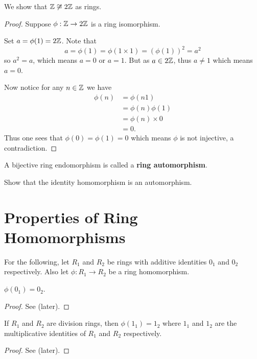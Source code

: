 \begin{example}
    We show that $\mathbb{Z} \not\cong 2\mathbb{Z}$ as rings.

    \begin{proof}
        Suppose $\phi: \mathbb{Z} \to 2\mathbb{Z}$ is a ring isomorphism.

        Set $a = \phi(1) = 2\mathbb{Z}$. Note that
        \[
            a = \phi(1) = \phi(1\times1) = (\phi(1))^2 = a^2
        \]
        so $a^2 = a$, which means $a = 0$ or $a = 1$. But as $a \in 2\mathbb{Z}$, thus $a \neq 1$ which means $a = 0$.

        Now notice for any $n \in \mathbb{Z}$ we have
        \begin{align*}
            \phi(n) &= \phi(n1)\\
            &= \phi(n)\phi(1)\\
            &= \phi(n) \times 0\\
            &= 0.
        \end{align*}
        Thus one sees that $\phi(0) = \phi(1) = 0$ which means $\phi$ is not injective, a contradiction.
    \end{proof}
\end{example}

\begin{definition}
    A bijective ring endomorphism is called a \textbf{ring automorphism}.
\end{definition}

\begin{exercise}\label{exercise-identity-homomorphism-is-an-isomorphism}
    Show that the identity homomorphism is an automorphism.
\end{exercise}

\section{Properties of Ring Homomorphisms}
For the following, let $R_1$ and $R_2$ be rings with additive identities $0_1$ and $0_2$ respectively. Also let $\phi: R_1 \to R_2$ be a ring homomorphism.

\begin{proposition}\label{prop-ring-image-of-additive-identity-is-additive-identity}
    $\phi(0_1) = 0_2$.
\end{proposition}
\begin{proof}
    See  (later).
\end{proof}

\begin{proposition}
    If $R_1$ and $R_2$ are division rings, then $\phi(1_1) = 1_2$ where $1_1$ and $1_2$ are the multiplicative identities of $R_1$ and $R_2$ respectively.
\end{proposition}
\begin{proof}
    See  (later).
\end{proof}


